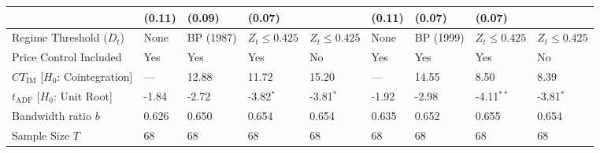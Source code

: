 \begin{table}[h!]
\begin{tabular}{p{3.5cm}p{1.35cm}p{1.35cm}p{1.35cm}p{1.35cm}p{1.35cm}p{1.35cm}p{1.35cm}p{1.35cm}}
		& (0.11) & (0.09) & (0.07) &  & (0.11) & (0.07) & (0.07) &  \\
		\midrule
		Regime Threshold ($D_t$) & None & BP (1987) & $Z_t \le 0.425$ & $Z_t \le 0.425$ & None & BP (1999) & $Z_t \le 0.425$ & $Z_t \le 0.425$ \\
		Price Control Included & Yes & Yes & Yes & No & Yes & Yes & Yes & No \\
		$CT_{\text{IM}}$ [$H_0$: Cointegration] & — & 12.88 & 11.72 & 15.20 & — & 14.55 & 8.50 & 8.39 \\
		$t_{\text{ADF}}$ [$H_0$: Unit Root] & -1.84 & -2.72 & -3.82$^{*}$ & -3.81$^{*}$ & -1.92 & -2.98 & -4.11$^{**}$ & -3.81$^{*}$ \\
		Bandwidth ratio $b$ & 0.626 & 0.650 & 0.654 & 0.654 & 0.635 & 0.652 & 0.655 & 0.654 \\
		Sample Size $T$ & 68 & 68 & 68 & 68 & 68 & 68 & 68 & 68 \\
		\bottomrule
	\end{tabular}
\end{table}
